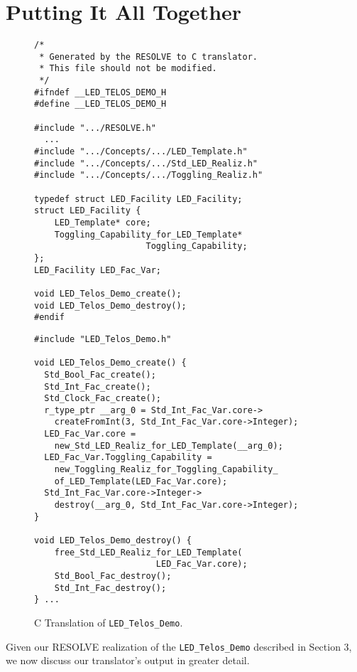 \section{Putting It All Together}

\begin{figure*}
\begin{minipage}{0.4\textwidth}
\begin{verbatim}
/*
 * Generated by the RESOLVE to C translator. 
 * This file should not be modified.
 */
#ifndef __LED_TELOS_DEMO_H
#define __LED_TELOS_DEMO_H

#include ".../RESOLVE.h"
  ...
#include ".../Concepts/.../LED_Template.h"
#include ".../Concepts/.../Std_LED_Realiz.h"
#include ".../Concepts/.../Toggling_Realiz.h"

typedef struct LED_Facility LED_Facility;
struct LED_Facility {
    LED_Template* core;
    Toggling_Capability_for_LED_Template* 
                      Toggling_Capability;
};
LED_Facility LED_Fac_Var;

void LED_Telos_Demo_create();
void LED_Telos_Demo_destroy();
#endif
\end{verbatim}
\end{minipage}
\hspace{1.5cm} 
\begin{minipage}{0.4\textwidth}
\begin{verbatim}
#include "LED_Telos_Demo.h"

void LED_Telos_Demo_create() {
  Std_Bool_Fac_create();
  Std_Int_Fac_create();
  Std_Clock_Fac_create();
  r_type_ptr __arg_0 = Std_Int_Fac_Var.core->
    createFromInt(3, Std_Int_Fac_Var.core->Integer);
  LED_Fac_Var.core = 
    new_Std_LED_Realiz_for_LED_Template(__arg_0);
  LED_Fac_Var.Toggling_Capability = 
    new_Toggling_Realiz_for_Toggling_Capability_
    of_LED_Template(LED_Fac_Var.core);
  Std_Int_Fac_Var.core->Integer->
    destroy(__arg_0, Std_Int_Fac_Var.core->Integer);
}

void LED_Telos_Demo_destroy() {
    free_Std_LED_Realiz_for_LED_Template(
    				    LED_Fac_Var.core);
    Std_Bool_Fac_destroy();
    Std_Int_Fac_destroy();
} ...
\end{verbatim}
\end{minipage}
\caption{C Translation of \texttt{LED\_Telos\_Demo}.}
\label{fig:demo}
\end{figure*}

Given our RESOLVE realization of the \texttt{LED\_Telos\_Demo} described in Section 3, we now discuss our translator's output in greater detail.

